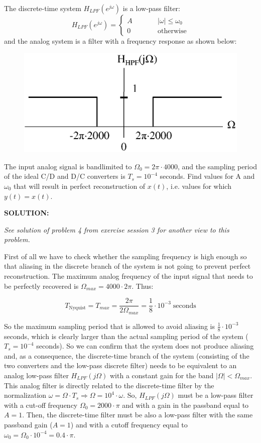 \documentclass[a4paper,11pt,oneside]{article}
\begin{document}
The discrete-time system $H_{LPF}(e^{j\omega})$ is a low-pass filter:
\[
H_{LPF}(e^{j\omega})=\left\{\begin{array}{lll}
A & \qquad &|\omega|\leq \omega_{0}\\
0 & \qquad &\textrm{otherwise}
\end{array}\right.
\]
and the analog system is a filter with a frequency response as shown below: 

\begin{figure}[h!]
\centering
\includegraphics[width=.6\textwidth]{fig32.eps}
\label{fig:fig3}
\end{figure}

The input analog signal is bandlimited to $\Omega_{0}=2\pi\cdot 4000$, and the sampling period of the ideal C/D and D/C converters is $T_s=10^{-4}$ seconds. Find values for A and $\omega_{0}$ that will result in perfect reconstruction of $x(t)$, i.e. values for which $y(t)=x(t)$.






\vspace{1cm}

\textbf{SOLUTION:} 

\emph{See solution of problem 4 from exercise session 3 for another view to this problem.}

First of all we have to check whether the sampling frequency is high enough so that aliasing in the discrete branch of the system is not going to prevent perfect reconstruction. The maximum analog frequency of the input signal that needs to be perfectly recovered is $\Omega_{max}=4000\cdot 2\pi$. Thus:

\[
T_{\textrm{Nyquist}}=T_{max}=\frac{2\pi}{2\Omega_{max}}=\frac{1}{8}\cdot 10^{-3}\; \textrm{seconds}
\]

So the maximum sampling period that is allowed to avoid aliasing is $\frac{1}{8}\cdot 10^{-3}$ seconds, which is clearly larger than the actual sampling period of the system ($T_s=10^{-4}$ seconds). So we can confirm that the system does not produce aliasing and, as a consequence, the discrete-time branch of the system (consisting of the two converters and the low-pass discrete filter) needs to be equivalent to an analog low-pass filter $H_{LPF}(j\Omega)$ with a constant gain for the band $|\Omega|<\Omega_{max}$. This analog filter is directly related to the discrete-time filter by the normalization $\omega=\Omega\cdot T_s \Longrightarrow \Omega = 10^4 \cdot \omega$. So, $H_{LPF}(j\Omega)$ must be a low-pass filter with a cut-off frequency $\Omega_0=2000\cdot \pi$ and with a gain in the passband equal to $A=1$. Then, the discrete-time filter must be also a low-pass filter with the same passband gain ($A=1$) and with a cutoff frequency equal to $\omega_0=\Omega_0\cdot 10^{-4}=0.4\cdot\pi$.
\end{document}
